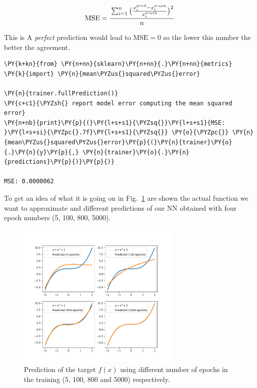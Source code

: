 \[\textrm{MSE} = \cfrac{\sum_{i=1}^n{\big(\frac{x_{i}^{pred} - x_i^{truth}}{x_i^{truth}}\big)^2}}{n}\]

This is 
A \emph{perfect} prediction would lead to \(\textrm{MSE}=0\) so the
lower this number the better the agreement.

\begin{tcolorbox}[breakable, size=fbox, boxrule=1pt, pad at break*=1mm,colback=cellbackground, colframe=cellborder]
\begin{Verbatim}[commandchars=\\\{\}]
\PY{k+kn}{from} \PY{n+nn}{sklearn}\PY{n+nn}{.}\PY{n+nn}{metrics} \PY{k}{import} \PY{n}{mean\PYZus{}squared\PYZus{}error}
	
\PY{n}{trainer.fullPrediction()}
\PY{c+c1}{\PYZsh{} report model error computing the mean squared error}
\PY{n+nb}{print}\PY{p}{(}\PY{l+s+s1}{\PYZsq{}}\PY{l+s+s1}{MSE: }\PY{l+s+si}{\PYZpc{}.7f}\PY{l+s+s1}{\PYZsq{}} \PY{o}{\PYZpc{}} \PY{n}{mean\PYZus{}squared\PYZus{}error}\PY{p}{(}\PY{n}{trainer}\PY{o}{.}\PY{n}{y}\PY{p}{,} \PY{n}{trainer}\PY{o}{.}\PY{n}{predictions}\PY{p}{)}\PY{p}{)}

MSE: 0.0000062
\end{Verbatim}
\end{tcolorbox}

To get an idea of what it is going on in Fig.~\ref{fig:training_vs_epochs} are shown the
actual function we want to approximate and different predictions of our
NN obtained with four epoch numbers (5, 100, 800, 5000).

\begin{figure}[htb]
	\centering
	\includegraphics[width=0.7\textwidth]{figures/training_vs_epoch}
	\caption{Prediction of the target $f(x)$ using different number of epochs in the training (5, 100, 800 and 5000) respectively.}
	\label{fig:training_vs_epochs}
\end{figure}


